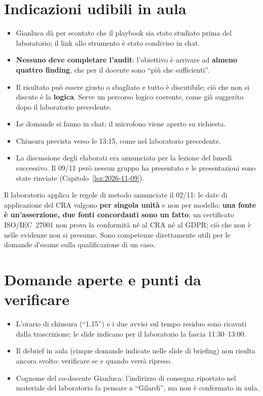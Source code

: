\section{Indicazioni udibili in aula}
\begin{itemize}
  \item Gianluca dà per scontato che il playbook sia stato studiato prima del laboratorio; il link
    allo strumento è stato condiviso in chat.
  \item \textbf{Nessuno deve completare l'audit}: l'obiettivo è arrivare ad \textbf{almeno quattro
    finding}, che per il docente sono ``più che sufficienti''.
  \item Il risultato può essere giusto o sbagliato e tutto è discutibile; ciò che non si discute è la
    \textbf{logica}. Serve un percorso logico coerente, come già suggerito dopo il laboratorio
    precedente.
  \item Le domande si fanno in chat; il microfono viene aperto su richiesta.
  \item Chiusura prevista verso le 13:15, come nel laboratorio precedente.
  \item La discussione degli elaborati era annunciata per la lezione del lunedì successivo. Il 09/11
    però nessun gruppo ha presentato e le presentazioni sono state rinviate
    (Capitolo~\ref{lez:2026-11-09}).
\end{itemize}

\begin{esame}
Il laboratorio applica le regole di metodo annunciate il 02/11: le date di applicazione del CRA
valgono \textbf{per singola unità} e non per modello; \textbf{una fonte è un'asserzione, due fonti
concordanti sono un fatto}; un certificato ISO/IEC~27001 non prova la conformità né al CRA né al GDPR;
ciò che non è nelle evidenze non si presume. Sono competenze direttamente utili per le domande
d'esame sulla qualificazione di un caso.
\end{esame}

\section{Domande aperte e punti da verificare}
\begin{verifica}
\begin{itemize}
  \item L'orario di chiusura (``1.15'') e i due avvisi sul tempo residuo sono ricavati dalla
    trascrizione; le slide indicano per il laboratorio la fascia 11:30--13:00.
  \item Il debrief in aula (cinque domande indicate nelle slide di briefing) non risulta ancora
    svolto: verificare se e quando verrà ripreso.
  \item Cognome del co-docente Gianluca: l'indirizzo di consegna riportato nel materiale del
    laboratorio fa pensare a ``Gilardi'', ma non è confermato in aula.
\end{itemize}
\end{verifica}
